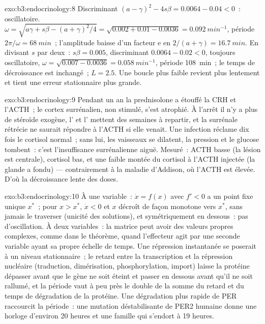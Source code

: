 \begin{solution}{exo:b3:endocrinology:8}
Discriminant $(a - \gamma)^{2} - 4s\beta = 0.0064 - 0.04 < 0$~:
oscillatoire. $\omega = \sqrt{a\gamma + s\beta - (a+\gamma)^{2}/4} =
\sqrt{0.002 + 0.01 - 0.0036} = \qty{0.092}{min^{-1}}$, période $2\pi/
\omega = \qty{68}{min}$~; l'amplitude baisse d'un facteur $\mathrm{e}$ en $2/(a +
\gamma) = \qty{16.7}{min}$. En divisant $s$ par deux~: $s\beta = 0.005$,
discriminant $0.0064 - 0.02 < 0$, toujours oscillatoire, $\omega = \sqrt{0.007 - 0.0036}
= \qty{0.058}{min^{-1}}$, période \qty{108}{min}~; le temps de
décroissance est inchangé~; $L = 2.5$. Une boucle plus faible revient
plus lentement et tient une erreur stationnaire plus grande.
\end{solution}

\begin{solution}{exo:b3:endocrinology:9}
Pendant un an la prednisolone a étouffé la CRH et l'ACTH~; le cortex
surrénalien, non stimulé, s'est atrophié. À l'arrêt il n'y a plus de
stéroïde exogène, l' et l' mettent des semaines à
repartir, et la surrénale rétrécie ne saurait répondre à l'ACTH si elle
venait. Une infection réclame dix fois le cortisol normal~; sans lui,
les vaisseaux se dilatent, la pression et le glucose tombent~: c'est
l'insuffisance surrénalienne aiguë. Mesuré~: ACTH basse (la lésion est
centrale), cortisol bas, et une faible montée du cortisol à l'ACTH
injectée (la glande a fondu) --- contrairement à la maladie d'Addison,
où l'ACTH est élevée. D'où la décroissance lente des doses.
\end{solution}

\begin{solution}{exo:b3:endocrinology:10}
À une variable~: $\dot x = f(x)$ avec $f' < 0$ a un point fixe unique
$x^{*}$~; pour $x > x^{*}$, $\dot x < 0$ et $x$ décroît de façon
monotone vers $x^{*}$, sans jamais le traverser (unicité des solutions),
et symétriquement en dessous~: pas d'oscillation. À deux variables~: la
matrice peut avoir des valeurs propres complexes, comme dans le
théorème, quand l'effecteur agit par une seconde variable ayant sa
propre échelle de temps. Une répression instantanée se poserait à un
niveau stationnaire~; le retard entre la transcription et la répression
nucléaire (traduction, dimérisation, phosphorylation, import) laisse la
protéine dépasser avant que le gène ne soit éteint et passer en dessous
avant qu'il ne soit rallumé, et la période vaut à peu près le double de
la somme du retard et du temps de dégradation de la protéine. Une
dégradation plus rapide de PER raccourcit la période~: une mutation
déstabilisante de PER2 humaine donne une horloge d'environ 20 heures et
une famille qui s'endort à 19 heures.
\end{solution}

